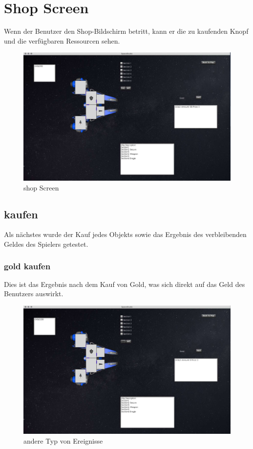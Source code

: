 \documentclass[12pt]{article}
\begin{document}
\section{Shop Screen}
Wenn der Benutzer den Shop-Bildschirm betritt, kann er die zu kaufenden Knopf und die verfügbaren Ressourcen sehen.
\begin{figure}[h]
\centering
\includegraphics[scale=0.4]{TestProtocolBilder/shopScreen.jpg}
\caption{shop Screen}
\end{figure}

\subsection{kaufen}
Als nächstes wurde der Kauf jedes Objekts sowie das Ergebnis des verbleibenden Geldes des Spielers getestet.

\subsubsection{gold kaufen}
Dies ist das Ergebnis nach dem Kauf von Gold, was sich direkt auf das Geld des Benutzers auswirkt.
\begin{figure}[htp]
\centering
\includegraphics[scale=0.4]{TestProtocolBilder/goldgekauft.jpg}
\caption{andere Typ von Ereignisse}
\end{figure}
\newpage
\end{document}
